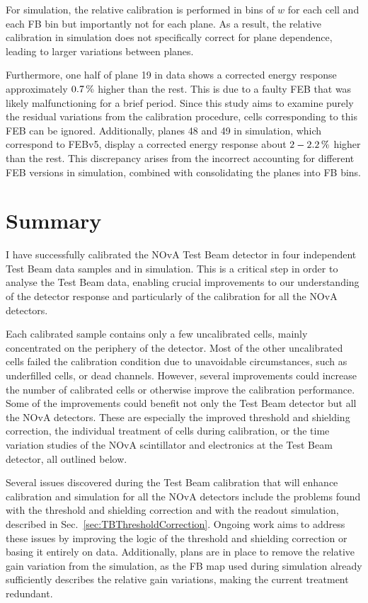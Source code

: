For simulation, the relative calibration is performed in bins of $w$ for each cell and each \gls{FB} bin but importantly not for each plane. As a result, the relative calibration in simulation does not specifically correct for plane dependence, leading to larger variations between planes.

Furthermore, one half of plane 19 in data shows a corrected energy response approximately $\unit[0.7]{\%}$ higher than the rest. This is due to a faulty \gls{FEB} that was likely malfunctioning for a brief period. Since this study aims to examine purely the residual variations from the calibration procedure, cells corresponding to this \gls{FEB} can be ignored. Additionally, planes 48 and 49 in simulation, which correspond to \gls{FEB}v5, display a corrected energy response about $\unit[2-2.2]{\%}$ higher than the rest. This discrepancy arises from the incorrect accounting for different \gls{FEB} versions in simulation, combined with consolidating the planes into \gls{FB} bins.

\section{Summary}\label{sec:TBCalibSummary}

I have successfully calibrated the NOvA Test Beam detector in four independent Test Beam data samples and in simulation. This is a critical step in order to analyse the Test Beam data, enabling crucial improvements to our understanding of the detector response and particularly of the calibration for all the \gls{NOvA} detectors.

Each calibrated sample contains only a few uncalibrated cells, mainly concentrated on the periphery of the detector. Most of the other uncalibrated cells failed the calibration condition due to unavoidable circumstances, such as underfilled cells, or dead channels. However, several improvements could increase the number of calibrated cells or otherwise improve the calibration performance. Some of the improvements could benefit not only the Test Beam detector but all the \gls{NOvA} detectors. These are especially the improved threshold and shielding correction, the individual treatment of cells during calibration, or the time variation studies of the \gls{NOvA} scintillator and electronics at the Test Beam detector, all outlined below.

Several issues discovered during the Test Beam calibration that will enhance calibration and simulation for all the \gls{NOvA} detectors include the problems found with the threshold and shielding correction and with the readout simulation, described in Sec.~\ref{sec:TBThresholdCorrection}. Ongoing work aims to address these issues by improving the logic of the threshold and shielding correction or basing it entirely on data. Additionally, plans are in place to remove the relative gain variation from the simulation, as the \gls{FB} map used during simulation already sufficiently describes the relative gain variations, making the current treatment redundant.


